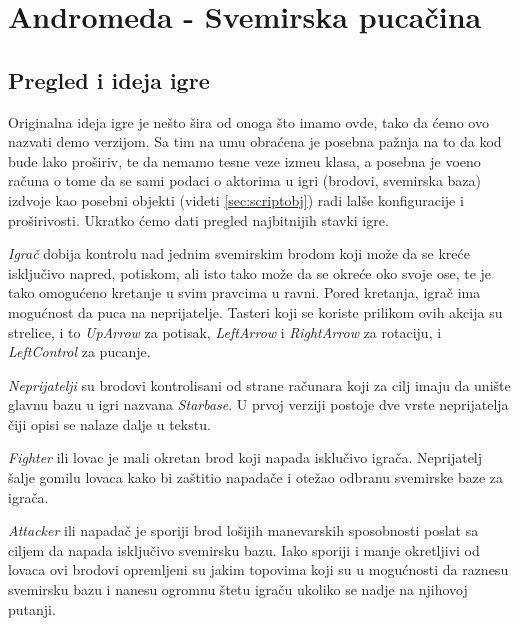 \clearpage
\section{Andromeda - Svemirska puca\v{c}ina}
\label{sec:Section_Name_X}

\subsection{Pregled i ideja igre}
Originalna ideja igre je ne\v{s}to \v{s}ira od onoga \v{s}to imamo ovde, tako da \'cemo ovo nazvati demo verzijom. Sa tim na umu
obra\'cena je posebna pa\v{z}nja na to da kod bude lako pro\v{s}iriv, te da nemamo tesne veze izme\dj u klasa, a posebna je vo\dj eno
ra\v{c}una o tome da se sami podaci o aktorima u igri (brodovi, svemirska baza) izdvoje kao posebni objekti (videti \ref{sec:scriptobj})
radi lal\v{s}e konfiguracije i pro\v{s}irivosti. Ukratko \'cemo dati pregled najbitnijih stavki igre.

\emph{Igra\v{c}} dobija kontrolu nad jednim svemirskim brodom koji mo\v{z}e da se kre\'ce isklju\v{c}ivo napred, potiskom, 
ali isto tako mo\v{z}e da se okre\'ce oko svoje ose, te je tako omogu\'ceno kretanje u svim pravcima u ravni. Pored kretanja,
igra\v{c} ima mogu\'cnost da puca na neprijatelje. Tasteri koji se koriste prilikom ovih akcija su strelice, i to \emph{UpArrow} za potisak,
\emph{LeftArrow} i \emph{RightArrow} za rotaciju, i \emph{LeftControl} za pucanje.

\emph{Neprijatelji} su brodovi kontrolisani od strane ra\v{c}unara koji za cilj imaju da uni\v{s}te glavnu
bazu u igri nazvana \emph{Starbase}. U prvoj verziji postoje dve vrste neprijatelja \v{c}iji opisi se nalaze
dalje u tekstu.

\emph{Fighter} ili lovac je mali okretan brod koji napada isklu\v{c}ivo igra\v{c}a. Neprijatelj \v{s}alje
gomilu lovaca kako bi za\v{s}titio napada\v{c}e i ote\v{z}ao odbranu svemirske baze za igra\v{c}a.

\emph{Attacker} ili napada\v{c} je sporiji brod lo\v{s}ijih manevarskih sposobnosti poslat sa ciljem da napada
isklju\v{c}ivo svemirsku bazu. Iako sporiji i manje okretljivi od lovaca ovi brodovi opremljeni su jakim topovima
koji su u mogu\'cnosti da raznesu svemirsku bazu i nanesu ogromnu \v{s}tetu igra\v{c}u ukoliko se nadje
na njihovoj putanji.

